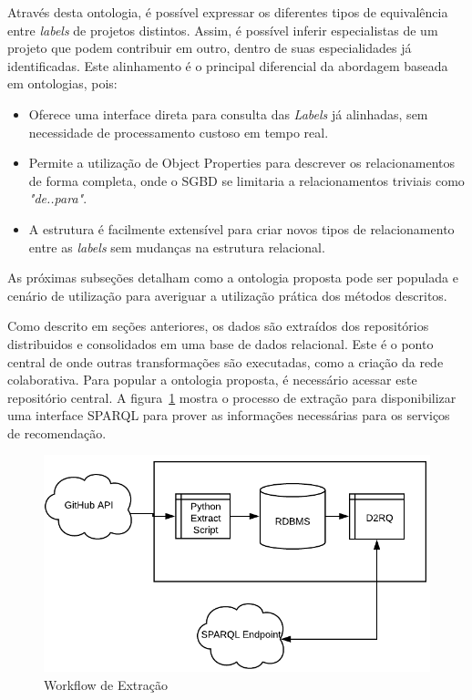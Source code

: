 \documentclass[peerreview]{acmart}
\begin{document}
Através desta ontologia, é possível expressar os diferentes tipos de equivalência entre \textit{labels} de projetos distintos. Assim, é possível inferir especialistas de um projeto que podem contribuir em outro, dentro de suas especialidades já identificadas. Este alinhamento é o principal diferencial da abordagem baseada em ontologias, pois:

\begin{itemize}
  \item Oferece uma interface direta para consulta das \textit{Labels} já alinhadas, sem necessidade de processamento custoso em tempo real.
  \item Permite a utilização de Object Properties para descrever os relacionamentos de forma completa, onde o SGBD se limitaria a relacionamentos triviais como \textit{"de..para"}.
  \item A estrutura é facilmente extensível para criar novos tipos de relacionamento entre as \textit{labels} sem mudanças na estrutura relacional.
\end{itemize}

As próximas subseções detalham como a ontologia proposta pode ser populada e cenário de utilização para averiguar a utilização prática dos métodos descritos.

Como descrito em seções anteriores, os dados são extraídos dos repositórios distribuidos e consolidados em uma base de dados relacional. Este é o ponto central de onde outras transformações são executadas, como a criação da rede colaborativa. Para popular a ontologia proposta, é necessário acessar este repositório central. A figura~\ref{fig:workflow_ontologia} mostra o processo de extração para disponibilizar uma interface SPARQL para prover as informações necessárias para os serviços de recomendação.

\begin{figure}[!htbp]
 \centering
 \includegraphics[width=\columnwidth]{workflow_ontologia}
 \caption{Workflow de Extração}\label{fig:workflow_ontologia}
\end{figure}
\end{document}

